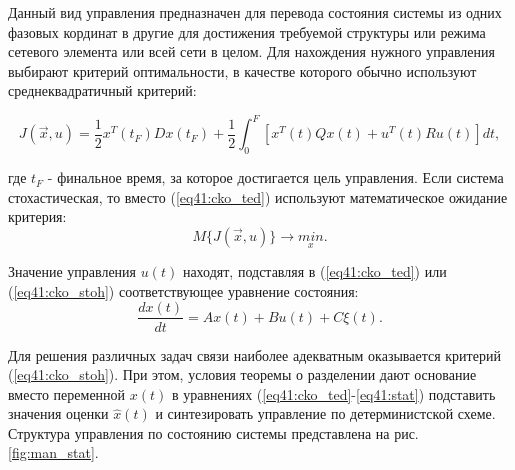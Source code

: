 Данный вид управления предназначен для перевода состояния системы из одних фазовых кординат в другие для достижения требуемой структуры или режима сетевого элемента или всей сети в целом. 
Для нахождения нужного управления выбирают критерий оптимальности, в качестве которого обычно используют среднеквадратичный критерий:


\begin{equation}\label{eq41:cko_ted}
J(\vec{x},u)=\frac{1}{2}x^T(t_F)Dx(t_F)+\frac{1}{2}\int^F_0[x^T(t)Qx(t)+u^T(t)Ru(t)]dt,
\end{equation}

\noindent где $t_F$ - финальное время, за которое достигается цель управления. Если система стохастическая, то вместо (\ref{eq41:cko_ted}) используют математическое ожидание критерия:
\begin{equation}\label{eq41:cko_stoh}
M\{J(\vec{x},u)\}\rightarrow \underset{x}{min}.
\end{equation}

Значение управления $u(t)$ находят,  подставляя в (\ref{eq41:cko_ted}) или (\ref{eq41:cko_stoh}) соответствующее уравнение состояния:
\begin{equation}\label{eq41:stat}
\frac{dx(t)}{dt}=Ax(t)+Bu(t)+C\xi(t).
\end{equation}

Для решения различных задач связи наиболее адекватным оказывается критерий (\ref{eq41:cko_stoh}).
При этом, условия теоремы о разделении дают основание вместо переменной $x(t)$ в уравнениях (\ref{eq41:cko_ted}-\ref{eq41:stat}) подставить значения оценки $\hat{x}(t)$ и синтезировать управление по детерминистской схеме.
Структура управления по состоянию системы представлена на рис. \ref{fig:man_stat}.

